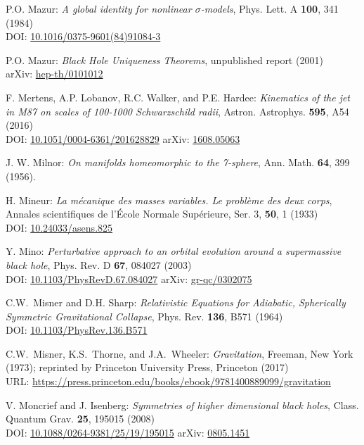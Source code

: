 \begin{thebibliography}{123}
P.O. Mazur:
{\em A global identity for nonlinear $\sigma$-models},
Phys. Lett. A {\bf 100}, 341 (1984)\\
DOI: \href{https://doi.org/10.1016/0375-9601(84)91084-3}{10.1016/0375-9601(84)91084-3}

P.O. Mazur:
{\em Black Hole Uniqueness Theorems},
unpublished report (2001)\\
arXiv: \href{https://arxiv.org/abs/hep-th/0101012}{hep-th/0101012}

F. Mertens, A.P. Lobanov, R.C. Walker, and P.E. Hardee:
{\em Kinematics of the jet in M87 on scales of 100-1000 Schwarzschild radii},
Astron. Astrophys. {\bf 595}, A54 (2016)\\
DOI: \href{https://doi.org/10.1051/0004-6361/201628829}{10.1051/0004-6361/201628829}\hfill
arXiv: \href{https://arxiv.org/abs/1608.05063}{1608.05063}

J. W. Milnor: {\em On manifolds homeomorphic to the 7-sphere},
Ann. Math. {\bf 64}, 399 (1956).

H. Mineur: {\em La mécanique des masses variables. Le problème des deux corps},
Annales scientifiques de l'École Normale Supérieure, Ser. 3, {\bf 50}, 1 (1933)\\
DOI: \href{https://doi.org/10.24033/asens.825}{10.24033/asens.825}

Y. Mino:
{\em Perturbative approach to an orbital evolution around a supermassive black hole},
Phys. Rev. D {\bf 67}, 084027 (2003)\\
DOI: \href{https://doi.org/10.1103/PhysRevD.67.084027}{10.1103/PhysRevD.67.084027}\hfill
arXiv: \href{https://arxiv.org/abs/gr-qc/0302075}{gr-qc/0302075}

C.W.~Misner and D.H. Sharp:
{\em Relativistic Equations for Adiabatic, Spherically Symmetric Gravitational Collapse},
Phys. Rev. {\bf 136}, B571 (1964)\\
DOI: \href{https://doi.org/10.1103/PhysRev.136.B571}{10.1103/PhysRev.136.B571}

C.W.~Misner, K.S.~Thorne, and J.A.~Wheeler:
{\em Gravitation},
Freeman, New York (1973);
reprinted by Princeton University Press, Princeton (2017)\\
URL: \url{https://press.princeton.edu/books/ebook/9781400889099/gravitation}

V. Moncrief and J. Isenberg:
{\em Symmetries of higher dimensional black holes},
Class. Quantum Grav. {\bf 25}, 195015 (2008)\\
DOI: \href{https://doi.org/10.1088/0264-9381/25/19/195015}{10.1088/0264-9381/25/19/195015}\hfill
arXiv: \href{https://arxiv.org/abs/0805.1451}{0805.1451}


\end{thebibliography}
